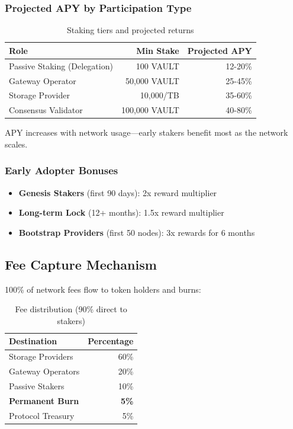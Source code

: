 \documentclass[12pt,a4paper]{article}
\begin{document}
\subsubsection{Projected APY by Participation Type}

\begin{table}[h]
\centering
\begin{tabular}{@{}lrr@{}}
\toprule
\textbf{Role} & \textbf{Min Stake} & \textbf{Projected APY} \\
\midrule
Passive Staking (Delegation) & 100 VAULT & 12-20\% \\
Gateway Operator & 50,000 VAULT & 25-45\% \\
Storage Provider & 10,000/TB & 35-60\% \\
Consensus Validator & 100,000 VAULT & 40-80\% \\
\bottomrule
\end{tabular}
\caption{Staking tiers and projected returns}
\end{table}

\noindent APY increases with network usage—early stakers benefit most as the network scales.

\subsubsection{Early Adopter Bonuses}

\begin{itemize}
    \item \textbf{Genesis Stakers} (first 90 days): 2x reward multiplier
    \item \textbf{Long-term Lock} (12+ months): 1.5x reward multiplier
    \item \textbf{Bootstrap Providers} (first 50 nodes): 3x rewards for 6 months
\end{itemize}

\subsection{Fee Capture Mechanism}

100\% of network fees flow to token holders and burns:

\begin{table}[h]
\centering
\begin{tabular}{@{}lr@{}}
\toprule
\textbf{Destination} & \textbf{Percentage} \\
\midrule
Storage Providers & 60\% \\
Gateway Operators & 20\% \\
Passive Stakers & 10\% \\
\textbf{Permanent Burn} & \textbf{5\%} \\
Protocol Treasury & 5\% \\
\bottomrule
\end{tabular}
\caption{Fee distribution (90\% direct to stakers)}
\end{table}
\end{document}
